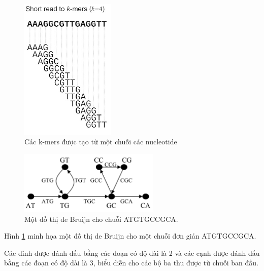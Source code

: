 \documentclass[10pt]{beamer}
\theoremstyle{remark}
\numberwithin{algocf}{section}
\numberwithin{equation}{section}
\numberwithin{dl}{section}
\numberwithin{figure}{section}
\begin{document}
\begin{frame}
    \begin{figure}[h!]
        \centering
        \includegraphics[width=0.4\textwidth]{de_Bruijn_graph_example.png}
        \caption{Các k-mers được tạo từ một chuỗi các nucleotide}
    \end{figure}
\end{frame}
    
\begin{frame}
    \begin{figure}[h!]
        \centering
        \includegraphics[width=0.6\textwidth]{2.png}
        \caption{Một đồ thị de Bruijn cho chuỗi ATGTGCCGCA.}
        \label{fig:2}
    \end{figure}

    Hình \ref{fig:2} minh họa một đồ thị de Bruijn cho một chuỗi đơn giản ATGTGCCGCA.

    Các đỉnh được đánh dấu bằng các đoạn có độ dài là 2 và các cạnh được đánh dấu bằng các đoạn có độ dài là 3, biểu diễn cho các bộ ba thu được từ chuỗi ban đầu.
\end{frame}
\end{document}
